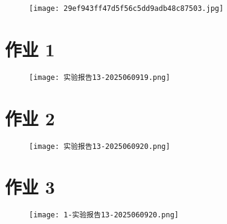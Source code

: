 \begin{figure}[H]
\centering
\texttt{[image: 29ef943ff47d5f56c5dd9adb48c87503.jpg]}
\label{}
\end{figure}

\section{作业 1}

\begin{figure}[H]
\centering
\texttt{[image: 实验报告13-2025060919.png]}
\label{}
\end{figure}

\section{作业 2}

\begin{figure}[H]
\centering
\texttt{[image: 实验报告13-2025060920.png]}
\label{}
\end{figure}

\section{作业 3}

\begin{figure}[H]
\centering
\texttt{[image: 1-实验报告13-2025060920.png]}
\label{}
\end{figure}
